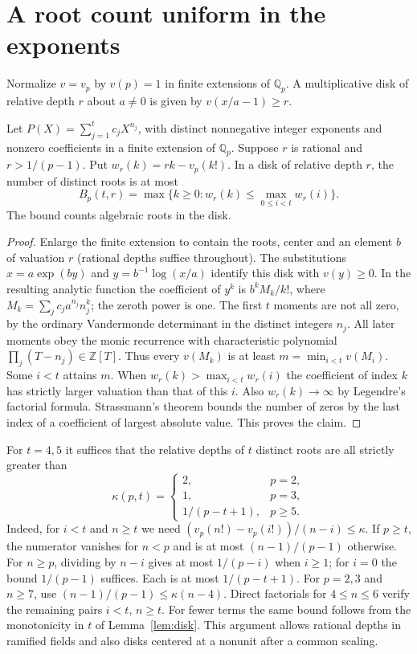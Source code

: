 \documentclass[11pt,letterpaper]{article}
\newcommand{\Q}{\mathbb Q}\newcommand{\Z}{\mathbb Z}\newcommand{\F}{\mathbb F}
\begin{document}
\section{A root count uniform in the exponents}\label{sec:local}
Normalize $v=v_p$ by $v(p)=1$ in finite extensions of $\Q_p$. A multiplicative disk of relative depth $r$ about $a\ne0$ is given by $v(x/a-1)\ge r$.
\begin{lemma}\label{lem:disk}
Let $P(X)=\sum_{j=1}^t c_jX^{n_j}$, with distinct nonnegative integer exponents and nonzero coefficients in a finite extension of $\Q_p$. Suppose $r$ is rational and $r>1/(p-1)$. Put $w_r(k)=rk-v_p(k!)$. In a disk of relative depth $r$, the number of distinct roots is at most
\[
 B_p(t,r)=\max\{k\ge0 : w_r(k)\le\max_{0\le i<t} w_r(i)\}.
\]
The bound counts algebraic roots in the disk.
\end{lemma}
\begin{proof}
Enlarge the finite extension to contain the roots, center and an element $b$ of valuation $r$ (rational depths suffice throughout). The substitutions $x=a\exp(by)$ and $y=b^{-1}\log(x/a)$ identify this disk with $v(y)\ge0$. In the resulting analytic function the coefficient of $y^k$ is $b^k M_k/k!$, where $M_k=\sum_j c_j a^{n_j}n_j^k$; the zeroth power is one. The first $t$ moments are not all zero, by the ordinary Vandermonde determinant in the distinct integers $n_j$. All later moments obey the monic recurrence with characteristic polynomial $\prod_j(T-n_j)\in\Z[T]$. Thus every $v(M_k)$ is at least $m=\min_{i<t}v(M_i)$. Some $i<t$ attains $m$. When $w_r(k)>\max_{i<t}w_r(i)$ the coefficient of index $k$ has strictly larger valuation than that of this $i$. Also $w_r(k)\to\infty$ by Legendre's factorial formula. Strassmann's theorem bounds the number of zeros by the last index of a coefficient of largest absolute value. This proves the claim.
\end{proof}
For $t=4,5$ it suffices that the relative depths of $t$ distinct roots are all strictly greater than
\[
 \kappa(p,t)=
 \begin{cases}2,&p=2,\\1,&p=3,\\1/(p-t+1),&p\ge5.\end{cases}
 \tag{1}
\]
Indeed, for $i<t$ and $n\ge t$ we need $(v_p(n!)-v_p(i!))/(n-i)\le\kappa$. If $p\ge t$, the numerator vanishes for $n<p$ and is at most $(n-1)/(p-1)$ otherwise. For $n\ge p$, dividing by $n-i$ gives at most $1/(p-i)$ when $i\ge1$; for $i=0$ the bound $1/(p-1)$ suffices. Each is at most $1/(p-t+1)$. For $p=2,3$ and $n\ge7$, use $(n-1)/(p-1)\le\kappa(n-4)$. Direct factorials for $4\le n\le6$ verify the remaining pairs $i<t$, $n\ge t$. For fewer terms the same bound follows from the monotonicity in $t$ of Lemma~\ref{lem:disk}. This argument allows rational depths in ramified fields and also disks centered at a nonunit after a common scaling.
\clearpage

\clearpage
\end{document}
